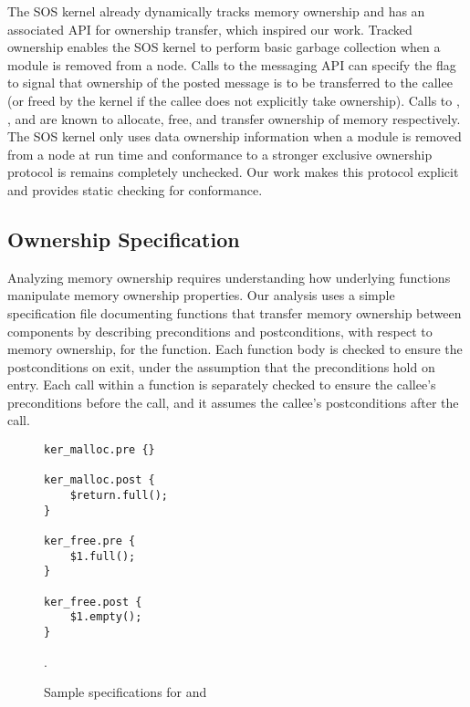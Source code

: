 The SOS kernel already dynamically tracks memory ownership and has an
associated API for ownership transfer, which inspired our work.  
%
Tracked ownership enables the SOS kernel to perform basic garbage collection
when a module is removed from a node.
%
Calls to the messaging API can specify the  flag to
signal that ownership of the posted message is to be transferred to the
callee (or freed by the kernel if the callee does not explicitly take
ownership).  
%
Calls to , , and
 are known to allocate, free, and transfer
ownership of memory respectively.
%
The SOS kernel only uses data ownership information when a module is removed
from a node at run time and conformance to a stronger exclusive ownership
protocol is remains completely unchecked.
%
Our work makes this protocol explicit and provides static checking for
conformance.



\subsection{Ownership Specification}


%  
%  



Analyzing memory ownership requires understanding how underlying functions
manipulate memory ownership properties.
%
Our analysis uses a simple specification file documenting functions that
transfer memory ownership between components by describing preconditions and
postconditions, with respect to memory ownership, for the function.
%
Each function body is checked to ensure the postconditions on exit, under
the assumption that the preconditions hold on entry.  
%
Each call within a function is separately checked to ensure the callee's
preconditions before the call, and it assumes the callee's postconditions
after the call.



\begin{figure}[tp]
\begin{scriptsize}
\begin{verbatim}
ker_malloc.pre {}

ker_malloc.post {
    $return.full();
}

ker_free.pre {
    $1.full();
}

ker_free.post {
    $1.empty();
}
\end{verbatim}
\end{scriptsize}
\caption{\label{fig:spec}Sample specifications for  and
}.
\end{figure}



